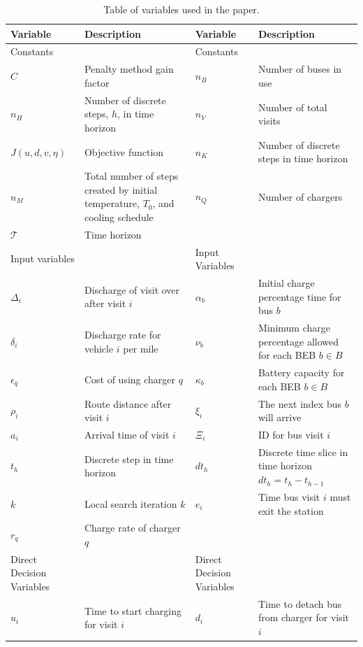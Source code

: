 \documentclass[11pt,a4paper,final]{article}
\newcommand{\T}{\mathcal{T}}                %
\newcommand{\Tau}{T}                        %
\newcommand{\Bset}{B}                       %
\begin{document}
\begin{table}[htbp]
\caption{\label{tab:variables}Table of variables used in the paper.}
\centering
\begin{tabularx}{\textwidth}{L{0.3} L{1.2} L{0.3} L{1.2}}
\textbf{Variable} & \textbf{Description} & \textbf{Variable} & \textbf{Description}\\[0pt]
\hline
Constants &  & Constants & \\[0pt]
\(C\) & Penalty method gain factor & \(n_B\) & Number of buses in use\\[0pt]
\(n_H\) & Number of discrete steps, \(h\), in time horizon & \(n_V\) & Number of total visits\\[0pt]
\(J(u,d,v,\eta)\) & Objective function & \(n_K\) & Number of discrete steps in time horizon\\[0pt]
\(n_M\) & Total number of steps created by initial temperature, \(\Tau_0\), and cooling schedule & \(n_Q\) & Number of chargers\\[0pt]
\(\T\) & Time horizon &  & \\[0pt]
\hline
Input variables &  & Input Variables & \\[0pt]
\(\Delta_i\) & Discharge of visit over after visit \(i\) & \(\alpha_b\) & Initial charge percentage time for bus \(b\)\\[0pt]
\(\delta_i\) & Discharge rate for vehicle \(i\) per mile & \(\nu_b\) & Minimum charge percentage allowed for each BEB \(b \in \Bset\)\\[0pt]
\(\epsilon_q\) & Cost of using charger \(q\) & \(\kappa_b\) & Battery capacity for each BEB \(b \in \Bset\)\\[0pt]
\(\rho_i\) & Route distance after visit \(i\) & \(\xi_i\) & The next index bus \(b\) will arrive\\[0pt]
\(a_i\) & Arrival time of visit \(i\) & \(\Xi_i\) & ID for bus visit \(i\)\\[0pt]
\(t_h\) & Discrete step in time horizon & \(dt_h\) & Discrete time slice in time horizon \(dt_h = t_h - t_{h-1}\)\\[0pt]
\(k\) & Local search iteration \(k\) & \(e_i\) & Time bus visit \(i\) must exit the station\\[0pt]
\(r_q\) & Charge rate of charger \(q\) &  & \\[0pt]
\hline
Direct Decision Variables &  & Direct Decision Variables & \\[0pt]
\(u_i\) & Time to start charging for visit \(i\) & \(d_i\) & Time to detach bus from charger for visit \(i\)\\[0pt]

\end{tabularx}
\end{table}
\end{document}
